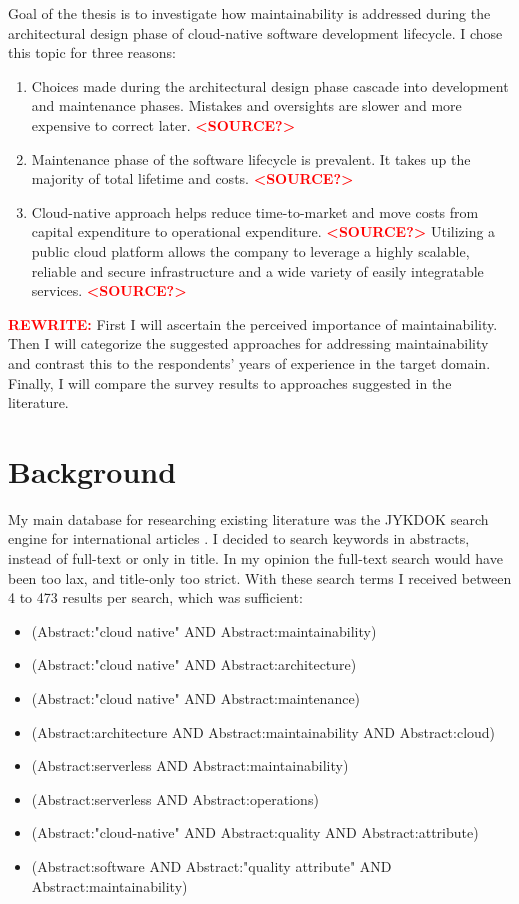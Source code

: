 \documentclass[utf8,english]{gradu3}
\newcommand{\todo}[1]{\textbf{\textcolor{red}{#1}}}
\begin{document}
Goal of the thesis is to investigate how maintainability is addressed during
the architectural design phase of cloud-native software development lifecycle.
I chose this topic for three reasons:
\begin{enumerate}
  \item Choices made during the architectural design phase cascade into
        development and maintenance phases.
        Mistakes and oversights are slower and more expensive to correct later. \todo{<SOURCE?>}
  \item Maintenance phase of the software lifecycle is prevalent.
        It takes up the majority of total lifetime and costs. \todo{<SOURCE?>}
  \item Cloud-native approach helps reduce time-to-market and move costs from
        capital expenditure to operational expenditure. \todo{<SOURCE?>}
        Utilizing a public cloud platform allows the company to leverage a
        highly scalable, reliable and secure infrastructure and a wide variety
        of easily integratable services. \todo{<SOURCE?>}
\end{enumerate}

\todo{REWRITE:}
First I will ascertain the perceived importance of maintainability.
Then I will categorize the suggested approaches for addressing maintainability
and contrast this to the respondents' years of experience in the target domain.
Finally, I will compare the survey results to approaches suggested in the literature.


\chapter{Background}

My main database for researching existing literature was the JYKDOK search engine for international articles \parencite{jykdok}.
I decided to search keywords in abstracts, instead of full-text or only in title.
In my opinion the full-text search would have been too lax, and title-only too strict.
With these search terms I received between 4 to 473 results per search, which was sufficient:
\begin{itemize}
  \item (Abstract:"cloud native" AND Abstract:maintainability)
  \item (Abstract:"cloud native" AND Abstract:architecture)
  \item (Abstract:"cloud native" AND Abstract:maintenance)
  \item (Abstract:architecture AND Abstract:maintainability AND Abstract:cloud)
  \item (Abstract:serverless AND Abstract:maintainability)
  \item (Abstract:serverless AND Abstract:operations)
  \item (Abstract:"cloud-native" AND Abstract:quality AND Abstract:attribute)
  \item (Abstract:software AND Abstract:"quality attribute" AND Abstract:maintainability)
\end{itemize}
\end{document}
